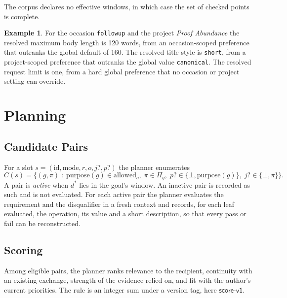 \documentclass[11pt]{article}
\theoremstyle{definition}
\newtheorem{example}[theorem]{Example}
\theoremstyle{remark}
\newcommand{\code}[1]{\texttt{#1}}
\begin{document}
The corpus declares no effective windows, in which case the set of checked points is complete.

\begin{example}
For the occasion \code{followup} and the project \emph{Proof Abundance} the resolved maximum body length is 120 words, from an occasion-scoped preference that outranks the global default of 160. The resolved title style is \code{short}, from a project-scoped preference that outranks the global value \code{canonical}. The resolved request limit is one, from a hard global preference that no occasion or project setting can override.
\end{example}

\section{Planning}\label{sec:plan}

\subsection{Candidate Pairs}

For a slot $s=(\mathrm{id},\mathrm{mode},r,o,j?,p?)$ the planner enumerates
\[
C(s)=\bigl\{(g,\pi)\;:\;\mathrm{purpose}(g)\in\mathrm{allowed}_o,\;\pi\in\Pi_g,\;p?\in\{\bot,\mathrm{purpose}(g)\},\;j?\in\{\bot,\pi\}\bigr\}.
\]
A pair is \emph{active} when $d^\ast$ lies in the goal's window. An inactive pair is recorded as such and is not evaluated. For each active pair the planner evaluates the requirement and the disqualifier in a fresh context and records, for each leaf evaluated, the operation, its value and a short description, so that every pass or fail can be reconstructed.

\subsection{Scoring}

Among eligible pairs, the planner ranks relevance to the recipient, continuity with an existing exchange, strength of the evidence relied on, and fit with the author's current priorities. The rule is an integer sum under a version tag, here $\mathsf{score\text{-}v1}$.
\end{document}
